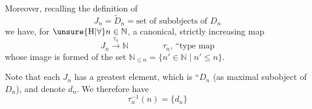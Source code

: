 Moreover, recalling the definition of
\[
 J_n=\widetilde D_n=\text{set of subobjects of }D_n
\]
we have, for \(\unsure{\mathrm{H}|\forall} n\in\mathbb N\), a canonical, strictly increasing map
\[
 J_n\xrightarrow{\tau_n}\mathbb N \qquad\qquad
 \text{\(\tau_n\), ``type map}
\]
whose image is formed  of the set
\(\mathbb N_{\leq n}=\{n'\in\mathbb N\mid n'\leq n\}\).

Note that each \(J_n\) has a greatest element, which is ``\(D_n\) (as  maximal subobject of \(D_n\)), and  denote \(d_n\). We therefore have 
\[
 \tau_n^{-1}(n)=\{d_n\}
\]

